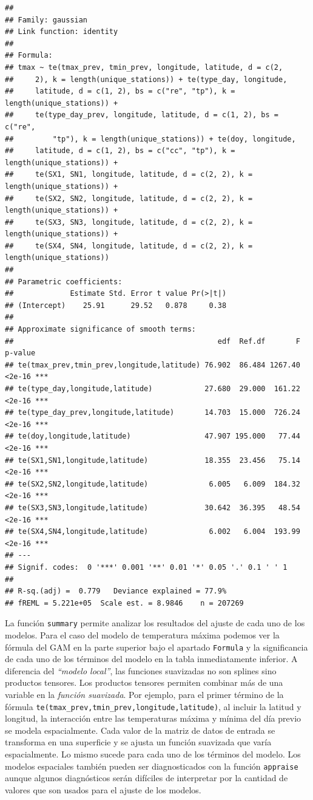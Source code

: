 \documentclass[
  12pt]{article}
\begin{document}
\begin{verbatim}
## 
## Family: gaussian 
## Link function: identity 
## 
## Formula:
## tmax ~ te(tmax_prev, tmin_prev, longitude, latitude, d = c(2, 
##     2), k = length(unique_stations)) + te(type_day, longitude, 
##     latitude, d = c(1, 2), bs = c("re", "tp"), k = length(unique_stations)) + 
##     te(type_day_prev, longitude, latitude, d = c(1, 2), bs = c("re", 
##         "tp"), k = length(unique_stations)) + te(doy, longitude, 
##     latitude, d = c(1, 2), bs = c("cc", "tp"), k = length(unique_stations)) + 
##     te(SX1, SN1, longitude, latitude, d = c(2, 2), k = length(unique_stations)) + 
##     te(SX2, SN2, longitude, latitude, d = c(2, 2), k = length(unique_stations)) + 
##     te(SX3, SN3, longitude, latitude, d = c(2, 2), k = length(unique_stations)) + 
##     te(SX4, SN4, longitude, latitude, d = c(2, 2), k = length(unique_stations))
## 
## Parametric coefficients:
##             Estimate Std. Error t value Pr(>|t|)
## (Intercept)    25.91      29.52   0.878     0.38
## 
## Approximate significance of smooth terms:
##                                               edf  Ref.df       F p-value    
## te(tmax_prev,tmin_prev,longitude,latitude) 76.902  86.484 1267.40  <2e-16 ***
## te(type_day,longitude,latitude)            27.680  29.000  161.22  <2e-16 ***
## te(type_day_prev,longitude,latitude)       14.703  15.000  726.24  <2e-16 ***
## te(doy,longitude,latitude)                 47.907 195.000   77.44  <2e-16 ***
## te(SX1,SN1,longitude,latitude)             18.355  23.456   75.14  <2e-16 ***
## te(SX2,SN2,longitude,latitude)              6.005   6.009  184.32  <2e-16 ***
## te(SX3,SN3,longitude,latitude)             30.642  36.395   48.54  <2e-16 ***
## te(SX4,SN4,longitude,latitude)              6.002   6.004  193.99  <2e-16 ***
## ---
## Signif. codes:  0 '***' 0.001 '**' 0.01 '*' 0.05 '.' 0.1 ' ' 1
## 
## R-sq.(adj) =  0.779   Deviance explained = 77.9%
## fREML = 5.221e+05  Scale est. = 8.9846    n = 207269
\end{verbatim}

La función \texttt{summary} permite analizar los resultados del ajuste de cada uno de los modelos. Para el caso del modelo de temperatura máxima podemos ver la fórmula del GAM en la parte superior bajo el apartado \texttt{Formula} y la significancia de cada uno de los términos del modelo en la tabla inmediatamente inferior. A diferencia del \emph{``modelo local''}, las funciones suavizadas no son splines sino productos tensores. Los productos tensores permiten combinar más de una variable en la \emph{función suavizada}. Por ejemplo, para el primer término de la fórmula \texttt{te(tmax\_prev,tmin\_prev,longitude,latitude)}, al incluir la latitud y longitud, la interacción entre las temperaturas máxima y mínima del día previo se modela espacialmente. Cada valor de la matriz de datos de entrada se transforma en una superficie y se ajusta un función suavizada que varía espacialmente. Lo mismo sucede para cada uno de los términos del modelo.
Los modelos espaciales también pueden ser diagnosticados con la función \texttt{appraise} aunque algunos diagnósticos serán difíciles de interpretar por la cantidad de valores que son usados para el ajuste de los modelos.
\end{document}
